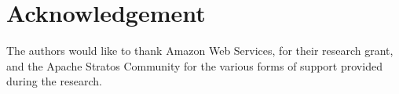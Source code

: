 \section{Acknowledgement}

The authors would like to thank Amazon Web Services, for their research grant, and the Apache Stratos Community for the various forms of support provided during the research.




